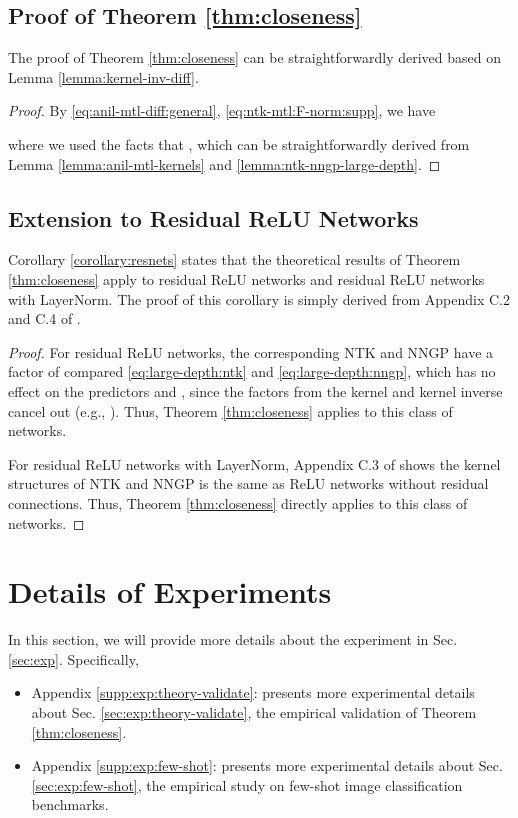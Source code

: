 \documentclass{article}
\begin{document}
\subsection{Proof of Theorem \ref{thm:closeness}}\label{supp:proof:main-theorem}



The proof of Theorem \ref{thm:closeness} can be straightforwardly derived based on Lemma \ref{lemma:kernel-inv-diff}.
\begin{proof}
By \eqref{eq:anil-mtl-diff:general}, \eqref{eq:ntk-mtl:F-norm:supp}, we have

where we used the facts that , which can be straightforwardly derived from Lemma \ref{lemma:anil-mtl-kernels} and \ref{lemma:ntk-nngp-large-depth}.
\end{proof}






\subsection{Extension to Residual ReLU Networks}\label{supp:proof:residual}

Corollary \ref{corollary:resnets} states that the theoretical results of Theorem \ref{thm:closeness} apply to residual ReLU networks and residual ReLU networks with LayerNorm. The proof of this corollary is simply derived from Appendix C.2 and C.4 of \citet{xiao2020dis}. 
\begin{proof}
For residual ReLU networks, the corresponding NTK and NNGP have a factor of  compared \eqref{eq:large-depth:ntk} and \eqref{eq:large-depth:nngp}, which has no effect on the predictors  and , since the factors from the kernel and kernel inverse cancel out (e.g., ). Thus, Theorem \ref{thm:closeness} applies to this class of networks.

For residual ReLU networks with LayerNorm, Appendix C.3 of \citet{xiao2020dis} shows the kernel structures of NTK and NNGP is the same as ReLU networks without residual connections. Thus, Theorem \ref{thm:closeness} directly applies to this class of networks.
\end{proof}

\section{Details of Experiments}\label{supp:exp}
In this section, we will provide more details about the experiment in Sec. \ref{sec:exp}. Specifically,
\begin{itemize}
    \item Appendix \ref{supp:exp:theory-validate}: presents more experimental details about Sec. \ref{sec:exp:theory-validate}, the empirical validation of Theorem \ref{thm:closeness}.
    \item Appendix \ref{supp:exp:few-shot}: presents more experimental details about Sec. \ref{sec:exp:few-shot}, the empirical study on few-shot image classification benchmarks.
\end{itemize}
\end{document}
